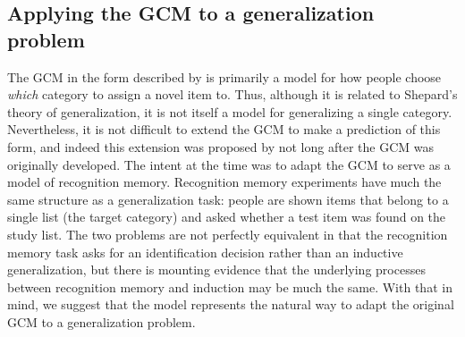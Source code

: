 \documentclass[doc,apacite]{apa6}
\begin{document}


\subsection{Applying the GCM to a generalization problem}

The GCM in the form described by  is primarily a model for how people choose {\it which} category to assign a novel item to. Thus, although it is related to Shepard's theory of generalization, it is not itself a model for generalizing a single category.
Nevertheless, it is not difficult to extend the GCM to make a prediction of this form, and indeed this extension was proposed by  not long after the GCM was originally developed. The intent at the time was to adapt the GCM to serve as a model of recognition memory. Recognition memory experiments have much the same structure as a generalization task: people are shown items that belong to a single list (the target category) and asked whether a test item was found on the study list. The two problems are not perfectly equivalent in that the recognition memory task asks for an identification decision rather than an inductive generalization, but there is mounting evidence \cite{nosofsky1991tests, hawkins2016dynamic, nosofsky2016exemplar, nosofsky2014exemplar} that the underlying processes between recognition memory and induction may be much the same. With that in mind, we suggest that the  model represents the natural way to adapt the original GCM to a generalization problem.
\end{document}
